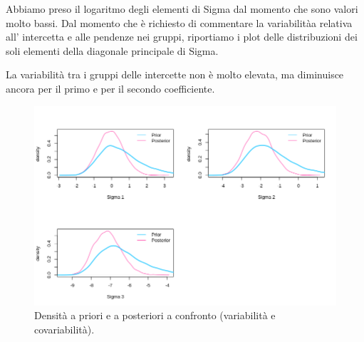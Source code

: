 Abbiamo preso il logaritmo degli elementi di Sigma dal momento che sono valori 
molto bassi. Dal momento che è richiesto di commentare la variabilitàa 
relativa all' intercetta e alle pendenze nei gruppi, 
riportiamo i plot delle distribuzioni dei soli elementi della diagonale principale di 
Sigma. 

La variabilità tra i gruppi delle intercette non è 
molto elevata, ma diminuisce ancora per il primo e per il secondo coefficiente.

\begin{figure}
  \centering
  \includegraphics[totalheight=8.5cm]{img/esercizio11-2-4.png}
  \caption{  Densità a priori e a posteriori a confronto (variabilità e covariabilità).}
\end{figure}

